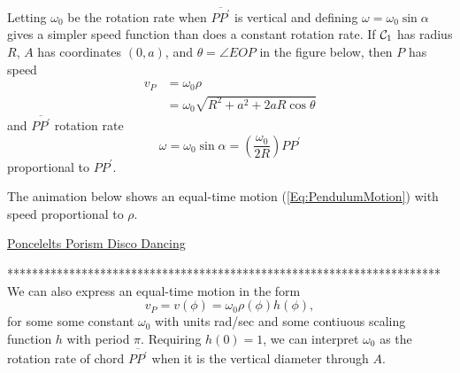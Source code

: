 \documentclass{ximera}
\begin{document}
Letting $\omega_0$ be the rotation rate when $\overline{PP^\prime}$ is vertical and defining $\omega = \omega_0 \sin\alpha$ %
gives a simpler speed function than does a constant rotation rate. If ${\cal C}_1$ has radius $R$, $A$ has coordinates $(0,a)$, and $\theta = \angle EOP$ in the figure below, then $P$ has speed
\begin{align*}
   v_P &= \omega_0 \rho \\
          &= \omega_0  \sqrt{R^2 + a^2 + 2aR\cos\theta} 
\end{align*}
and $\overline{PP^\prime}$ rotation rate
\begin{equation}
   \omega = \omega_0 \sin\alpha = \left( \frac{\omega_0}{2R} \right) PP^\prime  \label{Eq:PendulumMotion}
\end{equation}
proportional to $PP^\prime$.

\begin{onlineOnly}
    \begin{center}
\end{center}
\end{onlineOnly}



\begin{exploration}
The animation below shows an equal-time motion (\ref{Eq:PendulumMotion}) with speed proportional to $\rho$.
\begin{onlineOnly}
    \begin{center}
\end{center}
\end{onlineOnly}

\href{https://www.desmos.com/calculator/g2o1szpkh5}{Poncelelts Porism Disco Dancing}
\end{exploration}


\iffalse
**********************************************************************
We can also express an equal-time motion in the form
\[
      v_P = v(\phi) = \omega_0 \rho (\phi) h(\phi) ,
\]
for some some constant $\omega_0$ with units rad/sec and some contiuous scaling function $h$ with period $\pi$. Requiring $h(0)=1$, we can interpret $\omega_0$ as the rotation rate of chord $\overline{PP^\prime}$ when it is the vertical diameter through $A$.
\end{document}
